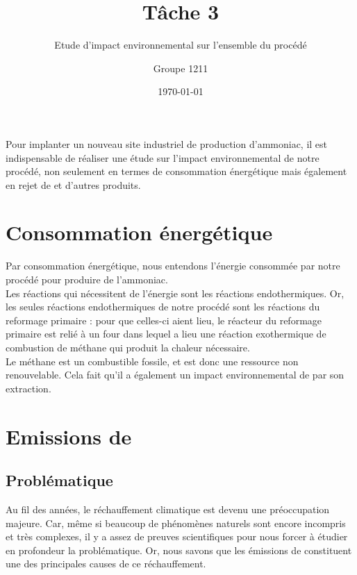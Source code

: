 \documentclass[10pt, a4paper, oneside]{scrartcl}
\begin{document}
\titlehead{}
\subject{}
\title{Tâche 3}
\subtitle{ Etude d’impact environnemental sur l’ensemble du procédé }
\author{Groupe 1211}
\publishers{}
\date{\today}

\dedication{}

\maketitle

Pour implanter un nouveau site industriel de production d'ammoniac, il est indispensable de réaliser une étude sur l'impact environnemental de notre procédé, non seulement en termes de consommation énergétique mais également en rejet de  et d'autres produits.

\section{Consommation énergétique}
Par consommation énergétique, nous entendons l'énergie consommée par notre procédé pour produire de l'ammoniac.
\\

Les réactions qui nécessitent de l'énergie sont les réactions endothermiques. Or, les seules réactions endothermiques de notre procédé sont les réactions du reformage primaire : pour que celles-ci aient lieu, le réacteur du reformage primaire est relié à un four dans lequel a lieu une réaction exothermique de combustion de méthane qui produit la chaleur nécessaire.
\\

Le méthane est un combustible fossile, et est donc une ressource non renouvelable. Cela fait qu'il a également un impact environnemental de par son extraction.

\section{Emissions de \texorpdfstring{}{CO \texttwoinferior}}
\subsection{Problématique \cite{prob1} \cite{changclim}}
Au fil des années, le réchauffement climatique est devenu une préoccupation majeure. Car, même si beaucoup de phénomènes naturels sont encore incompris et très complexes, il y a assez de preuves scientifiques pour nous forcer à étudier en profondeur la problématique. Or, nous savons que les émissions de  constituent une des principales causes de ce réchauffement. 
\\
\end{document}

